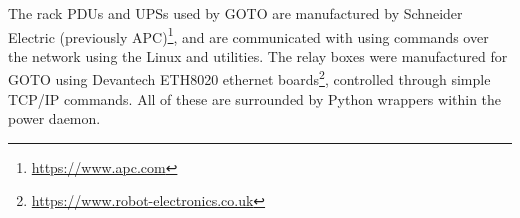 \begin{colsection}
\begin{colsection}
The rack PDUs and UPSs used by GOTO are manufactured by Schneider Electric (previously APC)\footnote{\url{https://www.apc.com}}, and are communicated with using  commands over the network using the Linux  and  utilities. The relay boxes were manufactured for GOTO using Devantech ETH8020 ethernet boards\footnote{\url{https://www.robot-electronics.co.uk}}, controlled through simple TCP/IP commands. All of these are surrounded by Python wrappers within the power daemon.

\end{colsection}


\end{colsection}

